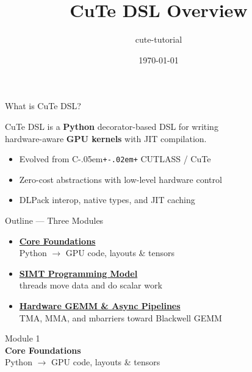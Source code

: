 \documentclass[aspectratio=169,11pt]{beamer}
\title[CuTe DSL Overview]{CuTe DSL Overview}
\author{cute-tutorial}
\date{\today}
\newcommand{\Cpp}{C\kern-.05em\texttt{+\kern-.02em+}}
\begin{document}
\begin{frame}[plain]
  \titlepage
\end{frame}

\begin{frame}{What is CuTe DSL?}
  \begin{center}
    \large
    CuTe DSL is a \textbf{Python} decorator-based DSL for writing\\
    hardware-aware \textbf{GPU kernels} with JIT compilation.
  \end{center}

  \vspace{1em}
  \begin{itemize}
    \item Evolved from \Cpp{} CUTLASS / CuTe
    \item Zero-cost abstractions with low-level hardware control
    \item DLPack interop, native types, and JIT caching
  \end{itemize}
\end{frame}

\begin{frame}{Outline --- Three Modules}
  \begin{itemize}
    \item[\textbf{1}] \hyperlink{mod:core}{\textbf{Core Foundations}}\\
          {\small Python $\rightarrow$ GPU code, layouts \& tensors}
    \vspace{0.6em}
    \item[\textbf{2}] \hyperlink{mod:simt}{\textbf{SIMT Programming Model}}\\
          {\small threads move data and do scalar work}
    \vspace{0.6em}
    \item[\textbf{3}] \hyperlink{mod:gemm}{\textbf{Hardware GEMM \& Async Pipelines}}\\
          {\small TMA, MMA, and mbarriers toward Blackwell GEMM}
  \end{itemize}
\end{frame}

\begin{frame}[plain]
  \hypertarget{mod:core}{}
  \centering
  \vfill
  {\small\color{gray} Module 1}\\[0.5em]
  {\Huge\bfseries Core Foundations}\\[1em]
  {\large Python $\rightarrow$ GPU code, layouts \& tensors}
  \vfill
\end{frame}
\end{document}
